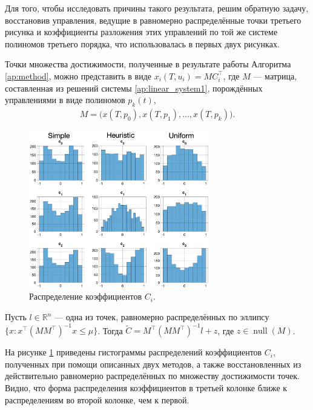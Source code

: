 \documentclass[../main.tex]{subfiles}
\begin{document}
 Для того, чтобы исследовать причины такого результата, решим обратную задачу, восстановив управления, ведущие в равномерно распределённые точки третьего рисунка и коэффициенты разложения этих управлений по той же системе полиномов третьего порядка, что использовалась в первых двух рисунках.
 
 Точки множества достижимости, полученные в результате работы Алгоритма \ref{ap:method}, можно представить в виде $x_i(T, u_i) = M C_i^{\top}$, где $M$ --- матрица, составленная из решений системы \eqref{ap:linear_system1}, порождённых управлениями в виде полиномов $p_k(t)$, 
 \begin{gather}\label{ap:matrix_M}
 	 M = \big(x(T, p_0), x(T, p_1), \dots, x(T, p_k)\big).
 \end{gather} 
 
 \begin{figure}[ht]
 	\centering
 	\includegraphics[width=0.7\textwidth]{images/three_coefficients_distribution.eps}
 	\caption{Распределение коэффициентов $C_i$.}
 	\label{fig:ap:three_coefficients_distribution}
 \end{figure}
 
 Пусть $l\in \mathbb{R}^{n}$ --- одна из точек, равномерно распределённых по эллипсу \\
 \mbox{$\{x: x^{\top} (M M^{\top})^{-1} x \leqslant \mu \}$}.
 Тогда $\widetilde{C} = M^{\top} (M M^{\top})^{-1} l + z$, где $z \in \operatorname{null}(M)$.
 
 На рисунке \ref{fig:ap:three_coefficients_distribution} приведены гистограммы распределений коэффициентов $C_i$, полученных при помощи описанных двух методов, а также восстановленных из действительно равномерно распределённых по множеству достижимости точек. 
 Видно, что форма распределения коэффициентов в третьей колонке ближе к распределениям во второй колонке, чем к первой. 
 
\end{document}

